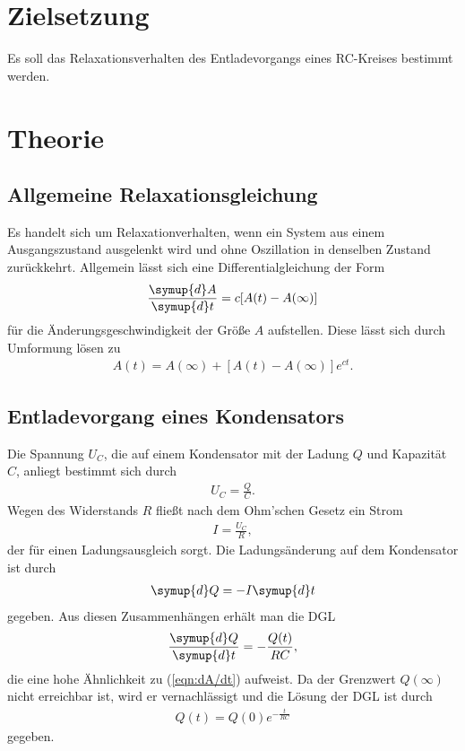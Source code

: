 \section{Zielsetzung}
\label{sec:Zielsetzung}
Es soll das Relaxationsverhalten des Entladevorgangs eines RC-Kreises bestimmt werden.

\section{Theorie}
\label{sec:Theorie}

\subsection{Allgemeine Relaxationsgleichung}
\label{sec:AllgemeineRelaxationsgleichung}

Es handelt sich um Relaxationverhalten, wenn ein System aus einem Ausgangszustand ausgelenkt wird und ohne Oszillation in denselben
Zustand zurückkehrt. Allgemein lässt sich eine Differentialgleichung der Form
\begin{align}
    \label{eqn:dA/dt}
    \frac{\symup{d}A}{\symup{d}t} = c[A(t)-A(\infty)]
\end{align}
für die Änderungsgeschwindigkeit der Größe $A$ aufstellen. Diese lässt sich durch Umformung lösen zu
\begin{align}
    \label{eqn:AllgemeineRelaxationsgleichung}
    A(t)=A(\infty)+[A(t)-A(\infty)]e^{ct}.
\end{align}

\subsection{Entladevorgang eines Kondensators}
\label{sec:EntladekurveeinesKondensators}

Die Spannung $U_C$, die auf einem Kondensator mit der Ladung $Q$ und Kapazität $C$, anliegt bestimmt sich durch
\begin{align*}
    U_C=\frac{Q}{C}.
\end{align*}
Wegen des Widerstands $R$ fließt nach dem Ohm'schen Gesetz ein Strom
\begin{align*}
    I=\frac{U_C}{R},
\end{align*}
der für einen Ladungsausgleich sorgt. Die Ladungsänderung auf dem Kondensator ist durch
\begin{align*}
    \symup{d}Q=-I\symup{d}t
\end{align*}
gegeben. Aus diesen Zusammenhängen erhält man die DGL
\begin{align}
    \label{eqn:dQ/dt}
    \frac{\symup{d}Q}{\symup{d}t}=-\frac{Q(t)}{RC},
\end{align}
die eine hohe Ähnlichkeit zu (\ref{eqn:dA/dt}) aufweist. Da der Grenzwert $Q(\infty)$ nicht erreichbar ist, wird er vernachlässigt und die Lösung
der DGL ist durch
\begin{align}
    \label{eqn:Entladung}
    Q(t)=Q(0)e^{-\frac{t}{RC}}
\end{align}
gegeben.

